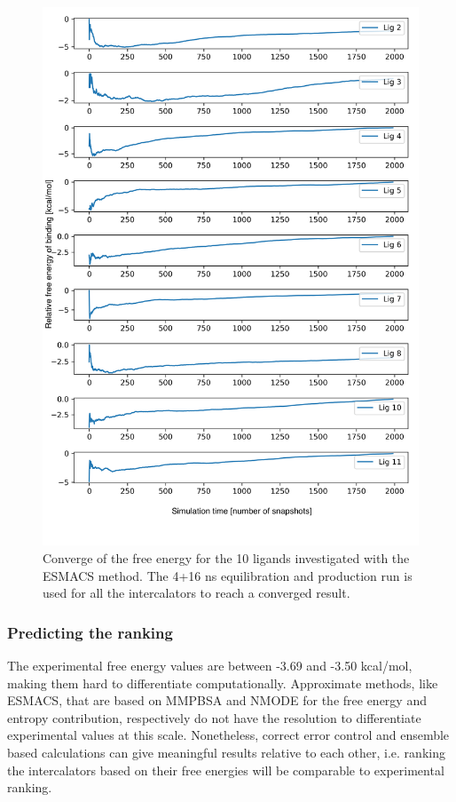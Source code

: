 \begin{figure}
  \includegraphics[width=\columnwidth]{mmpbsa_conv.png}
  \caption{Converge of the free energy for the 10 ligands investigated with the ESMACS method. The 4+16 ns equilibration and production run is used for all the intercalators to reach a converged result.}
  \label{fig:mmpbsa_conv}
\end{figure}

\subsubsection{Predicting the ranking}

The experimental free energy values are between -3.69 and -3.50 kcal/mol, making them hard to differentiate computationally. Approximate methods, like ESMACS, that are based on MMPBSA and NMODE for the free energy and entropy contribution, respectively do not have the resolution to differentiate experimental values at this scale. Nonetheless, correct error control and ensemble based calculations can give meaningful results relative to each other, i.e. ranking the intercalators based on their free energies will be comparable to experimental ranking.

